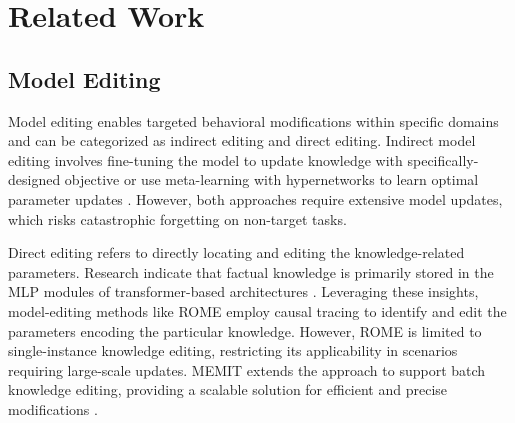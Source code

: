 \section{Related Work}
\subsection{Model Editing}
Model editing enables targeted behavioral modifications within specific domains and can be categorized as indirect editing and direct editing. Indirect model editing involves fine-tuning the model to update knowledge with specifically-designed objective \cite{zhu2020modifying, lee2022plug} or use meta-learning with hypernetworks to learn optimal parameter updates \cite{de2021editing,mitchell2021fast}. However, both approaches require extensive model updates, which risks catastrophic forgetting on non-target tasks.


Direct editing refers to directly locating and editing the knowledge-related parameters. Research indicate that factual knowledge is primarily stored in the MLP modules of transformer-based architectures \cite{geva2020transformer, geva2022transformer}.
Leveraging these insights, model-editing methods like ROME \cite{meng2022locating} employ causal tracing to identify and edit the parameters encoding the particular knowledge. However, ROME is limited to single-instance knowledge editing, restricting its applicability in scenarios requiring large-scale updates. MEMIT extends the approach to support batch knowledge editing, providing a scalable solution for efficient and precise modifications \cite{meng2022mass}. 

